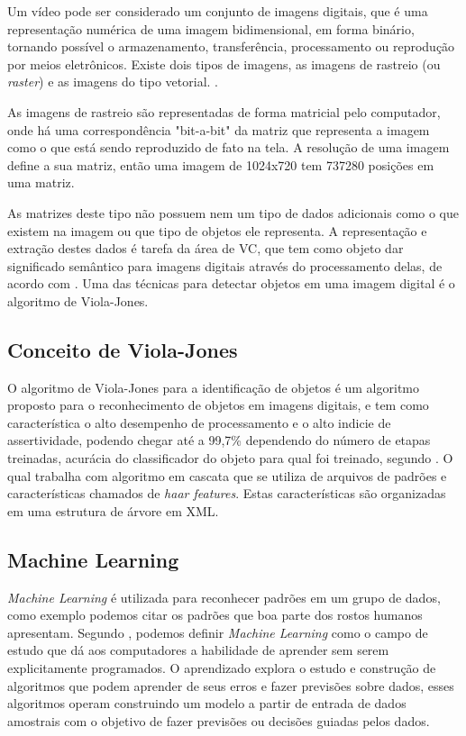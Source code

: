 Um vídeo pode ser considerado um conjunto de imagens digitais, que é uma representação numérica de uma imagem bidimensional, em forma binário, tornando possível o armazenamento, transferência, processamento ou reprodução por meios eletrônicos. Existe dois tipos de imagens, as imagens de rastreio (ou \textit{raster}) e as imagens do tipo vetorial. \cite{parker2010algorithms-UPPERCASE}.

As imagens de rastreio são representadas de forma matricial pelo computador, onde há uma correspondência "bit-a-bit" da matriz que representa a imagem como o que está sendo reproduzido de fato na tela. A resolução de uma imagem define a sua matriz, então uma imagem de 1024x720 tem 737280 posições em uma matriz. 

As matrizes deste tipo não possuem nem um tipo de dados adicionais como o que existem na imagem ou que tipo de objetos ele representa. A representação e extração destes dados é tarefa da área de VC, que tem como objeto dar significado semântico para imagens digitais através do processamento delas, de acordo com . Uma das técnicas para detectar objetos em uma imagem digital é o algoritmo de Viola-Jones.

\subsection{Conceito de Viola-Jones}

O algoritmo de Viola-Jones para a identificação de objetos é um algoritmo proposto para o reconhecimento de objetos em imagens digitais, e tem como característica o alto desempenho de processamento e o alto indicie de assertividade, podendo chegar até a 99,7\% dependendo do número de etapas treinadas, acurácia do classificador do objeto para qual foi treinado, segundo . O qual trabalha com algoritmo em cascata que se utiliza de arquivos de padrões e características chamados de \textit{haar features}. Estas características são organizadas em uma estrutura de árvore em XML.

\subsection{Machine Learning}

\textit{Machine Learning} é utilizada para reconhecer padrões em um grupo de dados, como exemplo podemos citar os padrões que boa parte dos rostos humanos apresentam. Segundo , podemos definir \textit{Machine Learning} como o campo de estudo que dá aos computadores a habilidade de aprender sem serem explicitamente programados. O aprendizado explora o estudo e construção de algoritmos que podem aprender de seus erros e fazer previsões sobre dados, esses algoritmos operam construindo um modelo a partir de entrada de dados amostrais com o objetivo de fazer previsões ou decisões guiadas pelos dados.

